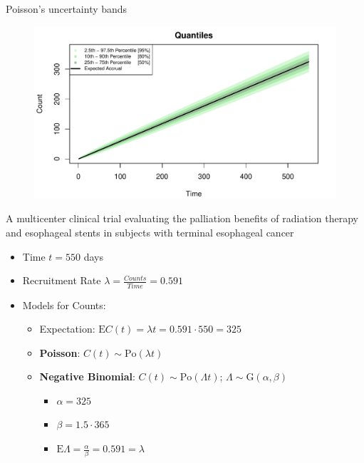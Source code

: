 \documentclass[english]{beamer}\usepackage[]{graphicx}\usepackage[]{xcolor}
\makeatletter
\def\maxwidth{ %
  \ifdim\Gin@nat@width>\linewidth
    \linewidth
  \else
    \Gin@nat@width
  \fi
}
\newenvironment{knitrout}{}{} %
\makeatother
\begin{document}
\begin{frame}{Poisson's uncertainty bands}


\begin{figure}
\begin{knitrout}
\color{fgcolor}
\includegraphics[width=\maxwidth]{figures/figunnamed-chunk-7-1} 
\end{knitrout}
\end{figure}

\end{frame}




\begin{frame}{A multicenter clinical trial evaluating the palliation benefits of radiation therapy and esophageal stents in subjects with terminal esophageal cancer}
\begin{itemize}
\item Time $t = 550$ days
\item Recruitment Rate $\lambda = \frac{Counts}{Time} = 0.591$
\item Models for Counts:
	\begin{itemize}
	\item Expectation: $\textrm{E}C(t) = \lambda t = 0.591 \cdot 550 = 325$
	\item \textbf{Poisson}: $C(t) \sim \textrm{Po}(\lambda t)$
	\item \textbf{Negative Binomial}: $C(t) \sim \textrm{Po} (\Lambda t)$; $\Lambda \sim \textrm{G}(\alpha,\beta)$
		\begin{itemize}
		\item $\alpha = 325$
		\item $\beta = 1.5\cdot 365$
		\item $\textrm{E} \Lambda = \frac{\alpha}{\beta} = 0.591 = \lambda$
		\end{itemize}
	\end{itemize}
\end{itemize}
\end{frame}
\end{document}
